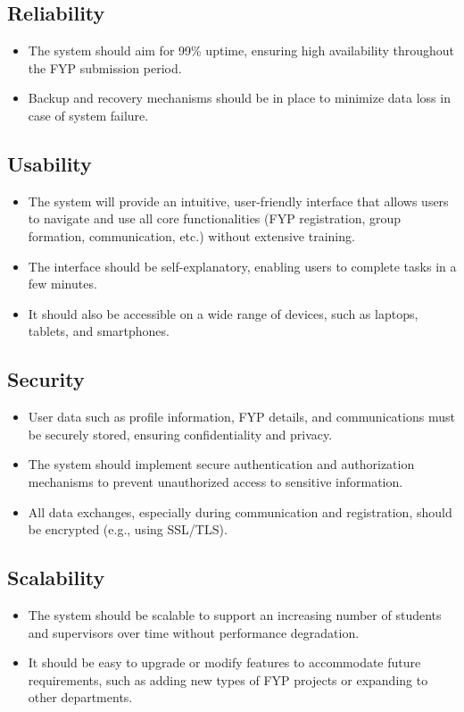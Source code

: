 \documentclass{FastFyp}
\begin{document}
\subsection{Reliability}
\begin{itemize}
    \item The system should aim for 99\% uptime, ensuring high availability throughout the FYP submission period.
    \item Backup and recovery mechanisms should be in place to minimize data loss in case of system failure.
\end{itemize}

\subsection{Usability}
\begin{itemize}
    \item The system will provide an intuitive, user-friendly interface that allows users to navigate and use all core functionalities (FYP registration, group formation, communication, etc.) without extensive training.
    \item The interface should be self-explanatory, enabling users to complete tasks in a few minutes.
    \item It should also be accessible on a wide range of devices, such as laptops, tablets, and smartphones.
\end{itemize}

\subsection{Security}
\begin{itemize}
    \item User data such as profile information, FYP details, and communications must be securely stored, ensuring confidentiality and privacy.
    \item The system should implement secure authentication and authorization mechanisms to prevent unauthorized access to sensitive information.
    \item All data exchanges, especially during communication and registration, should be encrypted (e.g., using SSL/TLS).
\end{itemize}

\subsection{Scalability}
\begin{itemize}
    \item The system should be scalable to support an increasing number of students and supervisors over time without performance degradation.
    \item It should be easy to upgrade or modify features to accommodate future requirements, such as adding new types of FYP projects or expanding to other departments.
\end{itemize}
\end{document}
